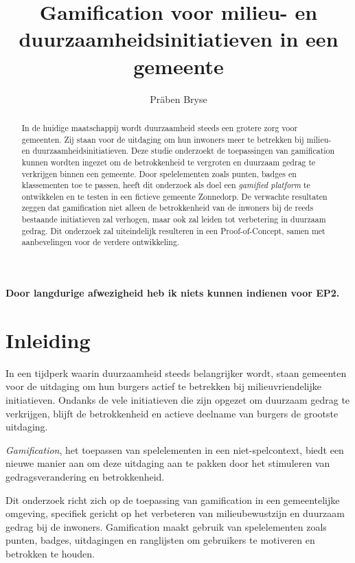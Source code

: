 \documentclass{hogent-article}
\title{Gamification voor milieu- en duurzaamheidsinitiatieven in een gemeente}
\author{Präben Bryse}
\begin{document}
    
\begin{abstract}
    In de huidige maatschappij wordt duurzaamheid steeds een grotere zorg voor gemeenten. Zij staan voor de uitdaging om hun inwoners meer te betrekken bij milieu- en duurzaamheidsinitiatieven. Deze studie onderzoekt de toepassingen van gamification kunnen wordten ingezet om de betrokkenheid te vergroten en duurzaam gedrag te verkrijgen binnen een gemeente. Door spelelementen zoals punten, badges en klassementen toe te passen, heeft dit onderzoek als doel een \emph{gamified platform} te ontwikkelen en te testen in een fictieve gemeente Zonnedorp. De verwachte resultaten zeggen dat gamification niet alleen de betrokkenheid van de inwoners bij de reeds bestaande initiatieven zal verhogen, maar ook zal leiden tot verbetering in duurzaam gedrag. Dit onderzoek zal uiteindelijk resulteren in een Proof-of-Concept, samen met aanbevelingen voor de verdere ontwikkeling. 
\end{abstract}

\tableofcontents

\bigskip

%
\paragraph{Door langdurige afwezigheid heb ik niets kunnen indienen voor EP2.}
%

\section{Inleiding}%
\label{sec:inleiding}

In een tijdperk waarin duurzaamheid steeds belangrijker wordt, staan gemeenten voor de uitdaging om hun burgers actief te betrekken bij milieuvriendelijke initiatieven. Ondanks de vele initiatieven die zijn opgezet om duurzaam gedrag te verkrijgen, blijft de betrokkenheid en actieve deelname van burgers de grootste uitdaging. 

\emph{Gamification}, het toepassen van spelelementen in een niet-spelcontext, biedt een nieuwe manier aan om deze uitdaging aan te pakken door het stimuleren van gedragsverandering en betrokkenheid.

Dit onderzoek richt zich op de toepassing van gamification in een gemeentelijke omgeving, specifiek gericht op het verbeteren van milieubewustzijn en duurzaam gedrag bij de inwoners. Gamification maakt gebruik van spelelementen zoals punten, badges, uitdagingen en ranglijsten om gebruikers te motiveren en betrokken te houden.
\end{document}
